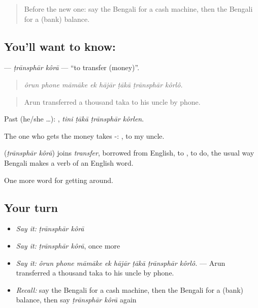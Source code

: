 \label{lesson:BN-C417-transphar-kora}



\begin{quote}
Before the new one: say the Bengali for a cash machine, then the Bengali for a (bank) balance.
\end{quote}

\subsection*{You'll want to know:  }
\textbf{ } — \emph{ṭrānsphār kôrā} — \textquotedblleft{}to transfer (money)\textquotedblright{}.

\begin{quote}
       
\end{quote}

\begin{quote}
\emph{ôrun phone māmāke ek hājār ṭākā ṭrānsphār kôrlô.}
\end{quote}

\begin{quote}
Arun transferred a thousand taka to his uncle by phone.
\end{quote}

Past (he/she …):    , \emph{tini ṭākā ṭrānsphār kôrlen}.

The one who gets the money takes -: , to my uncle.

\begin{cousinweb}
\textbf{ } (\emph{ṭrānsphār kôrā}) joins \emph{transfer}, borrowed from English, to , to do, the usual way Bengali makes a verb of an English word.
\end{cousinweb}

\begin{grammarlens}[title={What you've built}]
One more word for getting around.
\end{grammarlens}

\subsection*{Your turn}
\begin{itemize}
\raggedright
  \item \emph{Say it:} \emph{ṭrānsphār kôrā}
  \item \emph{Say it:} \emph{ṭrānsphār kôrā}, once more
  \item \emph{Say it:} \emph{ôrun phone māmāke ek hājār ṭākā ṭrānsphār kôrlô.} — Arun transferred a thousand taka to his uncle by phone.
  \item \emph{Recall:} say the Bengali for a cash machine, then the Bengali for a (bank) balance, then say \emph{ṭrānsphār kôrā} again
\end{itemize}

